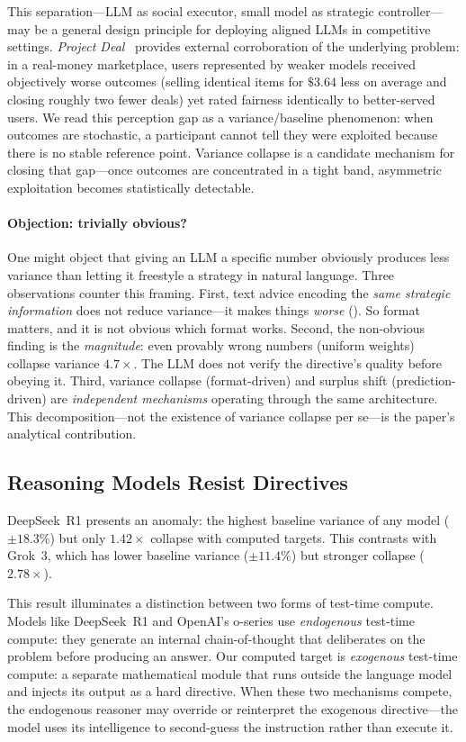 \documentclass[11pt,a4paper]{article}
\begin{document}
This separation---LLM as social executor, small model as strategic controller---may be a general design principle for deploying aligned LLMs in competitive settings. \emph{Project Deal}~\citep{anthropic2026projectdeal} provides external corroboration of the underlying problem: in a real-money marketplace, users represented by weaker models received objectively worse outcomes (selling identical items for $\$3.64$ less on average and closing roughly two fewer deals) yet rated fairness identically to better-served users. We read this perception gap as a variance/baseline phenomenon: when outcomes are stochastic, a participant cannot tell they were exploited because there is no stable reference point. Variance collapse is a candidate mechanism for closing that gap---once outcomes are concentrated in a tight band, asymmetric exploitation becomes statistically detectable.

\paragraph{Objection: trivially obvious?} One might object that giving an LLM a specific number obviously produces less variance than letting it freestyle a strategy in natural language. Three observations counter this framing. First, text advice encoding the \emph{same strategic information} does not reduce variance---it makes things \emph{worse} (). So format matters, and it is not obvious which format works. Second, the non-obvious finding is the \emph{magnitude}: even provably wrong numbers (uniform weights) collapse variance $4.7\times$. The LLM does not verify the directive's quality before obeying it. Third, variance collapse (format-driven) and surplus shift (prediction-driven) are \emph{independent mechanisms} operating through the same architecture. This decomposition---not the existence of variance collapse per se---is the paper's analytical contribution.

\subsection{Reasoning Models Resist Directives}
\label{sec:reasoning}

DeepSeek~R1 presents an anomaly: the highest baseline variance of any model ($\pm 18.3\%$) but only $1.42\times$ collapse with computed targets. This contrasts with Grok~3, which has lower baseline variance ($\pm 11.4\%$) but stronger collapse ($2.78\times$).

This result illuminates a distinction between two forms of test-time compute. Models like DeepSeek~R1 and OpenAI's o-series use \emph{endogenous} test-time compute: they generate an internal chain-of-thought that deliberates on the problem before producing an answer. Our computed target is \emph{exogenous} test-time compute: a separate mathematical module that runs outside the language model and injects its output as a hard directive. When these two mechanisms compete, the endogenous reasoner may override or reinterpret the exogenous directive---the model uses its intelligence to second-guess the instruction rather than execute it.
\end{document}
